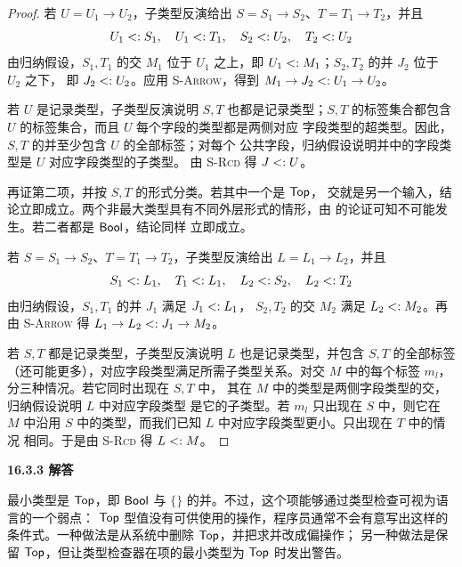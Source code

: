 \begin{taplauthorsolutionentrybox}
\begin{proof}
若 \(U=U_1\to U_2\)，子类型反演给出
\(S=S_1\to S_2\)、\(T=T_1\to T_2\)，并且
\[
 U_1\mathrel{<:} S_1,\quad U_1\mathrel{<:} T_1,\quad
 S_2\mathrel{<:} U_2,\quad T_2\mathrel{<:} U_2
\]
由归纳假设，\(S_1,T_1\) 的交 \(M_1\) 位于 \(U_1\) 之上，即
\(U_1\mathrel{<:} M_1\)；\(S_2,T_2\) 的并 \(J_2\) 位于 \(U_2\) 之下，
即 \(J_2\mathrel{<:} U_2\)。应用 \textsc{S-Arrow}，得到
\(M_1\to J_2\mathrel{<:} U_1\to U_2\)。

若 \(U\) 是记录类型，子类型反演说明 \(S,T\) 也都是记录类型；\(S,T\)
的标签集合都包含 \(U\) 的标签集合，而且 \(U\) 每个字段的类型都是两侧对应
字段类型的超类型。因此，\(S,T\) 的并至少包含 \(U\) 的全部标签；对每个
公共字段，归纳假设说明并中的字段类型是 \(U\) 对应字段类型的子类型。
由 \textsc{S-Rcd} 得 \(J\mathrel{<:} U\)。

再证第二项，并按 \(S,T\) 的形式分类。若其中一个是 \(\mathsf{Top}\)，
交就是另一个输入，结论立即成立。两个非最大类型具有不同外层形式的情形，由
的论证可知不可能发生。若二者都是
\(\mathsf{Bool}\)，结论同样
立即成立。

若 \(S=S_1\to S_2\)、\(T=T_1\to T_2\)，子类型反演给出
\(L=L_1\to L_2\)，并且
\[
 S_1\mathrel{<:} L_1,\quad T_1\mathrel{<:} L_1,\quad
 L_2\mathrel{<:} S_2,\quad L_2\mathrel{<:} T_2
\]
由归纳假设，\(S_1,T_1\) 的并 \(J_1\) 满足 \(J_1\mathrel{<:} L_1\)，
\(S_2,T_2\) 的交 \(M_2\) 满足 \(L_2\mathrel{<:} M_2\)。再由
\textsc{S-Arrow} 得 \(L_1\to L_2\mathrel{<:} J_1\to M_2\)。

若 \(S,T\) 都是记录类型，子类型反演说明 \(L\) 也是记录类型，并包含
\(S,T\) 的全部标签（还可能更多），对应字段类型满足所需子类型关系。对交
\(M\) 中的每个标签 \(m_l\)，分三种情况。若它同时出现在 \(S,T\) 中，
其在 \(M\) 中的类型是两侧字段类型的交，归纳假设说明 \(L\) 中对应字段类型
是它的子类型。若 \(m_l\) 只出现在 \(S\) 中，则它在 \(M\) 中沿用 \(S\)
中的类型，而我们已知 \(L\) 中对应字段类型更小。只出现在 \(T\) 中的情况
相同。于是由 \textsc{S-Rcd} 得 \(L\mathrel{<:} M\)。
\end{proof}

\end{taplauthorsolutionentrybox}

\begin{taplauthorsolutionentrybox}
\label{sol:author:16.3.3}
\textbf{16.3.3 解答}

最小类型是 \(\mathsf{Top}\)，即 \(\mathsf{Bool}\) 与 \(\{\}\)
的并。不过，这个项能够通过类型检查可视为语言的一个弱点：
\(\mathsf{Top}\) 型值没有可供使用的操作，程序员通常不会有意写出这样的
条件式。一种做法是从系统中删除 \(\mathsf{Top}\)，并把求并改成偏操作；
另一种做法是保留 \(\mathsf{Top}\)，但让类型检查器在项的最小类型为
\(\mathsf{Top}\) 时发出警告。

\end{taplauthorsolutionentrybox}

